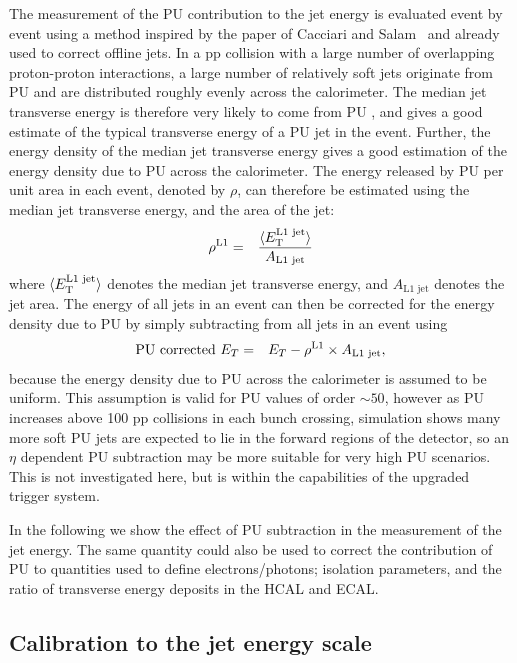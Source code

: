 The measurement of the PU contribution to the jet energy 
is evaluated event by event using a method inspired by the paper of 
Cacciari and Salam~\cite{rho_jetarea} and already used to correct offline jets.
In a pp collision with a large number of overlapping proton-proton interactions, 
a large number of relatively soft jets originate from PU and are distributed roughly 
evenly across the calorimeter.  
The median jet transverse energy is therefore very likely to come from PU , and gives a good estimate of the typical transverse energy of a \ac{PU} jet in the event.
Further, the energy density of the median jet transverse energy gives a good estimation of the energy density due to \ac{PU} across the calorimeter.
The energy released by \ac{PU} per unit area in each event, denoted by $\rho$, can therefore be estimated using the median jet transverse energy, and the area of the jet:
\begin{eqnarray}
 \rho^{\rm L1} &=& \frac{ \langle E^{\text{L1 jet}}_{\rm T} \rangle }{A_{\text{L1 jet}}}
\end{eqnarray}
where $\langle E^{\text{L1 jet}}_{\rm T} \rangle$ denotes the median jet transverse energy, and $A_{\text{L1 jet}}$ denotes the jet area.
The energy of all jets in an event can then be corrected for the energy density due to \ac{PU}  by
simply subtracting from all jets in an event using
\begin{eqnarray}
 \text{PU corrected }E_{T} &=& E_{T} - \rho^{\rm L1} \times A_{\text{L1 jet}} ,
 \label{eqn:PUsub}
\end{eqnarray}
because the energy density due to \ac{PU} across the calorimeter is assumed to be uniform. 
This assumption is valid for \ac{PU} values of order $\sim50$, however as \ac{PU} increases above 100 pp collisions in each bunch crossing, simulation shows many more soft \ac{PU} jets are expected to lie in the forward regions of the detector, so an $\eta$ dependent \ac{PU} subtraction may be more suitable for very high \ac{PU} scenarios.
This is not investigated here, but is within the capabilities of the upgraded trigger system.

In the following we show the effect of PU subtraction in the measurement of the
jet energy. The same quantity could also be used to correct the contribution of \ac{PU} to quantities used to define electrons/photons; isolation parameters, and the ratio of transverse energy deposits in the \ac{HCAL} and \ac{ECAL}.


\subsection{Calibration to the jet energy scale \label{jet_calib}}

